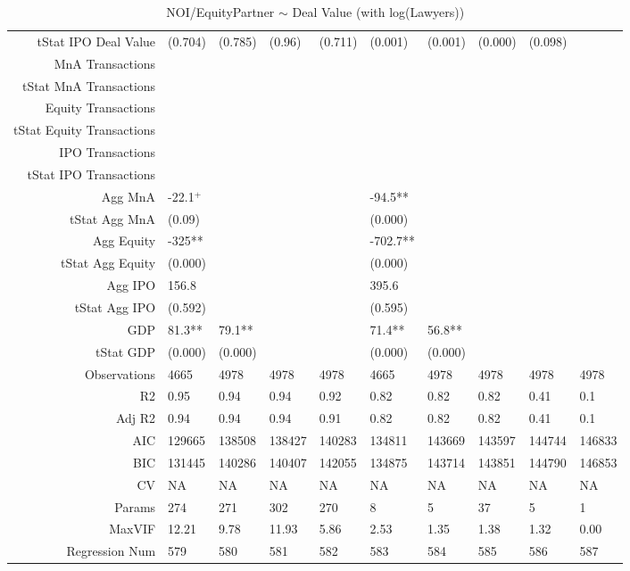 \begin{table}[ht]
\begin{tabular}{rlllllllll}
  tStat IPO Deal Value & (0.704) & (0.785) & (0.96) & (0.711) & (0.001) & (0.001) & (0.000) & (0.098) &  \\ 
  MnA Transactions &  &  &  &  &  &  &  &  &  \\ 
  tStat MnA Transactions &  &  &  &  &  &  &  &  &  \\ 
  Equity Transactions &  &  &  &  &  &  &  &  &  \\ 
  tStat Equity Transactions &  &  &  &  &  &  &  &  &  \\ 
  IPO Transactions &  &  &  &  &  &  &  &  &  \\ 
  tStat IPO Transactions &  &  &  &  &  &  &  &  &  \\ 
  Agg MnA & -22.1$^{+}$ &  &  &  & -94.5** &  &  &  &  \\ 
  tStat Agg MnA & (0.09) &  &  &  & (0.000) &  &  &  &  \\ 
  Agg Equity & -325** &  &  &  & -702.7** &  &  &  &  \\ 
  tStat Agg Equity & (0.000) &  &  &  & (0.000) &  &  &  &  \\ 
  Agg IPO & 156.8 &  &  &  & 395.6 &  &  &  &  \\ 
  tStat Agg IPO & (0.592) &  &  &  & (0.595) &  &  &  &  \\ 
  GDP & 81.3** & 79.1** &  &  & 71.4** & 56.8** &  &  &  \\ 
  tStat GDP & (0.000) & (0.000) &  &  & (0.000) & (0.000) &  &  &  \\ 
  Observations & 4665 & 4978 & 4978 & 4978 & 4665 & 4978 & 4978 & 4978 & 4978 \\ 
  R2 & 0.95 & 0.94 & 0.94 & 0.92 & 0.82 & 0.82 & 0.82 & 0.41 & 0.1 \\ 
  Adj R2 & 0.94 & 0.94 & 0.94 & 0.91 & 0.82 & 0.82 & 0.82 & 0.41 & 0.1 \\ 
  AIC & 129665 & 138508 & 138427 & 140283 & 134811 & 143669 & 143597 & 144744 & 146833 \\ 
  BIC & 131445 & 140286 & 140407 & 142055 & 134875 & 143714 & 143851 & 144790 & 146853 \\ 
  CV & NA & NA & NA & NA & NA & NA & NA & NA & NA \\ 
  Params & 274 & 271 & 302 & 270 & 8 & 5 & 37 & 5 & 1 \\ 
  MaxVIF & 12.21 & 9.78 & 11.93 & 5.86 & 2.53 & 1.35 & 1.38 & 1.32 & 0.00 \\ 
  Regression Num & 579 & 580 & 581 & 582 & 583 & 584 & 585 & 586 & 587 \\ 
   \hline
\end{tabular}
\caption{NOI/EquityPartner $\sim$ Deal Value (with log(Lawyers))} 
\end{table}
